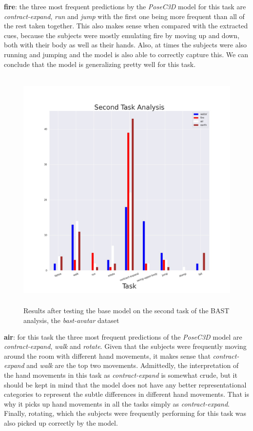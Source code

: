 \documentclass[extern,palatino]{cgMA}
\begin{document}
\bigskip
\noindent\textbf{fire}: the three most frequent predictions by the \textit{PoseC3D} model for this task are \textit{contract-expand}, \textit{run} and \textit{jump} with the first one being more frequent than all of the rest taken together. This also makes sense when compared with the extracted cues, because the subjects were mostly emulating fire by moving up and down, both with their body as well as their hands. Also, at times the subjects were also running and jumping and the model is also able to correctly capture this. We can conclude that the model is generalizing pretty well for this task.

\begin{figure}[h]
\includegraphics[height={350pt}, width={430pt}]{Thesis/images/avatar_analysis_top_1.jpg}
\caption{Results after testing the base model on the second task of the BAST analysis, the \textit{bast-avatar} dataset}
\label{avatar_analysis_top_1}
\end{figure}

\bigskip
\noindent\textbf{air}: for this task the three most frequent predictions of the \textit{PoseC3D} model are \textit{contract-expand}, \textit{walk} and \textit{rotate}. Given that the subjects were frequently moving around the room with different hand movements, it makes sense that \textit{contract-expand} and \textit{walk} are the top two movements. Admittedly, the interpretation of the hand movements in this task as \textit{contract-expand} is somewhat crude, but it should be kept in mind that the model does not have any better representational categories to represent the subtle differences in different hand movements. That is why it picks up hand movements in all the tasks simply as \textit{contract-expand}. Finally, rotating, which the subjects were frequently performing for this task was also picked up correctly by the model.
\end{document}
